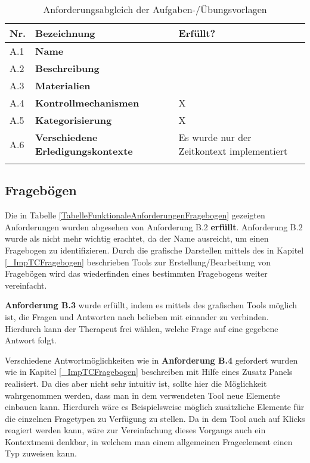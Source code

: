 \begin{table}[htbp]
	\begin{center}
		\begin{tabular}{p{} p{} p{}}
			\rowcolor{black!20} \textbf{Nr.} & \textbf{Bezeichnung} & \textbf{Erfüllt?} \\ \toprule 
			A.1 & \textbf{Name} & \checkmark \\ \hline \addlinespace
			A.2 & \textbf{Beschreibung} & \checkmark \\ \hline \addlinespace
			A.3 & \textbf{Materialien} & \checkmark \\ \hline \addlinespace
			A.4 & \textbf{Kontrollmechanismen} & X \\ \hline \addlinespace
			A.5 & \textbf{Kategorisierung} & X  \\ \hline \addlinespace
			A.6 & \textbf{Verschiedene Erledigungskontexte} & Es wurde nur der Zeitkontext implementiert \\ \hline \addlinespace
		\end{tabular}
	\end{center}
	\caption[Anforderungsabgleich der Aufgaben-/Übungsvorlagen]{Anforderungsabgleich der Aufgaben-/Übungsvorlagen}
	\label{TabelleAnforderungsabgleichVorlagen}
\end{table}

\subsection{Fragebögen}
Die in Tabelle \ref{TabelleFunktionaleAnforderungenFragebogen} gezeigten Anforderungen wurden abgesehen von Anforderung B.2 \textbf{erfüllt}. Anforderung B.2 wurde als nicht mehr wichtig erachtet, da der Name ausreicht, um einen Fragebogen zu identifizieren. Durch die grafische Darstellen mittels des in Kapitel \ref{_ImpTCFragebogen} beschrieben Tools zur Erstellung/Bearbeitung von Fragebögen wird das wiederfinden eines bestimmten Fragebogens weiter vereinfacht.

\textbf{Anforderung B.3} wurde erfüllt, indem es mittels des grafischen Tools möglich ist, die Fragen und Antworten nach belieben mit einander zu verbinden. Hierdurch kann der Therapeut frei wählen, welche Frage auf eine gegebene Antwort folgt.

Verschiedene Antwortmöglichkeiten wie in \textbf{Anforderung B.4} gefordert wurden wie in Kapitel \ref{_ImpTCFragebogen} beschreiben mit Hilfe eines Zusatz Panels realisiert. Da dies aber nicht sehr intuitiv ist, sollte hier die Möglichkeit wahrgenommen werden, dass man in dem verwendeten Tool neue Elemente einbauen kann. Hierdurch wäre es Beispielsweise möglich zusätzliche Elemente für die einzelnen Fragetypen zu Verfügung zu stellen. Da in dem Tool auch auf Klicks reagiert werden kann, wäre zur Vereinfachung dieses Vorgangs auch ein Kontextmenü denkbar, in welchem man einem allgemeinen Frageelement einen Typ zuweisen kann.

